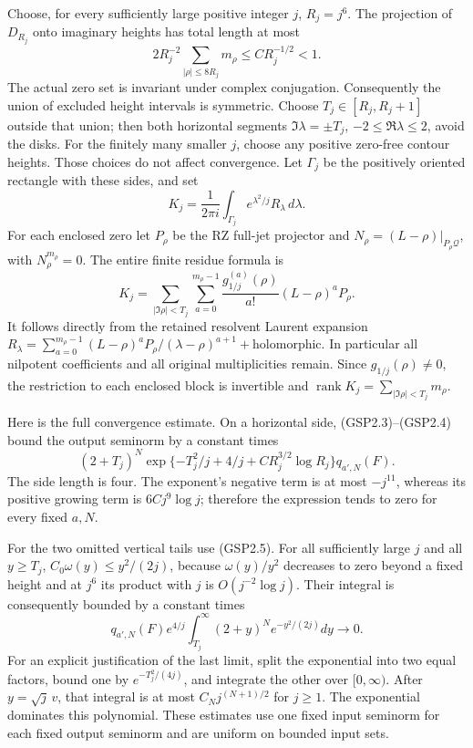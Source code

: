 Choose, for every sufficiently large positive integer \(j\),
\(R_j=j^6\). The projection of \(D_{R_j}\) onto imaginary heights has
total length at most \[
2R_j^{-2}\sum_{|\rho|\le8R_j}m_\rho\le C R_j^{-1/2}<1.
\tag{GSP4.1}
\] The actual zero set is invariant under complex conjugation.
Consequently the union of excluded height intervals is symmetric. Choose
\(T_j\in[R_j,R_j+1]\) outside that union; then both horizontal segments
\(\Im\lambda=\pm T_j\), \(-2\le\Re\lambda\le2\), avoid the disks. For
the finitely many smaller \(j\), choose any positive zero-free contour
heights. Those choices do not affect convergence. Let \(\Gamma_j\) be
the positively oriented rectangle with these sides, and set \[
K_j=\frac1{2\pi i}\int_{\Gamma_j}e^{\lambda^2/j}R_\lambda\,d\lambda.
\tag{GSP4.2}
\] For each enclosed zero let \(P_\rho\) be the RZ full-jet projector
and \(N_\rho=(L-\rho)|_{P_\rho\mathcal Q}\), with \(N_\rho^{m_\rho}=0\).
The entire finite residue formula is \[
K_j=\sum_{|\Im\rho|<T_j}\sum_{a=0}^{m_\rho-1}
\frac{g_{1/j}^{(a)}(\rho)}{a!}(L-\rho)^aP_\rho.
\tag{GSP4.3}
\] It follows directly from the retained resolvent Laurent expansion
\(R_\lambda=\sum_{a=0}^{m_\rho-1}(L-\rho)^aP_\rho/(\lambda-\rho)^{a+1}+\text{holomorphic}\).
In particular all nilpotent coefficients and all original multiplicities
remain. Since \(g_{1/j}(\rho)\ne0\), the restriction to each enclosed
block is invertible and
\(\operatorname{rank}K_j=\sum_{|\Im\rho|<T_j}m_\rho\).

Here is the full convergence estimate. On a horizontal side,
(GSP2.3)--(GSP2.4) bound the output seminorm by a constant times \[
(2+T_j)^N\exp\{-T_j^2/j+4/j+C R_j^{3/2}\log R_j\}
q_{a',N}(F).
\tag{GSP4.4}
\] The side length is four. The exponent's negative term is at most
\(-j^{11}\), whereas its positive growing term is \(6Cj^9\log j\);
therefore the expression tends to zero for every fixed \(a,N\).

For the two omitted vertical tails use (GSP2.5). For all sufficiently
large \(j\) and all \(y\ge T_j\), \(C_0\omega(y)\le y^2/(2j)\), because
\(\omega(y)/y^2\) decreases to zero beyond a fixed height and at \(j^6\)
its product with \(j\) is \(O(j^{-2}\log j)\). Their integral is
consequently bounded by a constant times \[
q_{a',N}(F)e^{4/j}\int_{T_j}^\infty(2+y)^N e^{-y^2/(2j)}dy\longrightarrow0.
\tag{GSP4.5}
\] For an explicit justification of the last limit, split the
exponential into two equal factors, bound one by \(e^{-T_j^2/(4j)}\),
and integrate the other over \([0,\infty)\). After \(y=\sqrt j\,v\),
that integral is at most \(C_N j^{(N+1)/2}\) for \(j\ge1\). The
exponential dominates this polynomial. These estimates use one fixed
input seminorm for each fixed output seminorm and are uniform on bounded
input sets.

